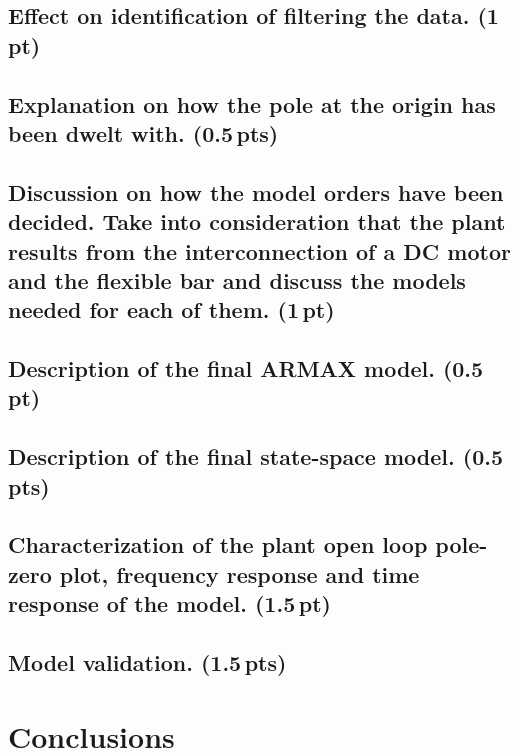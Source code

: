 \documentclass[a4paper,12pt]{article}
\begin{document}
\subsection{Effect on identification of filtering the data. (1\,pt)}
\vspace{10pt}


\subsection{Explanation on how the pole at the origin has been dwelt with. (0.5\,pts)}
\vspace{10pt}


\subsection{Discussion on how the model orders have been decided. Take into consideration that the plant results from the interconnection of a DC motor and the flexible bar and discuss the models needed for each of them. (1\,pt)}
\vspace{10pt}


\subsection{Description of the final ARMAX model. (0.5\,pt)}
\vspace{10pt}


\subsection{Description of the final state-space model. (0.5\,pts)}
\vspace{10pt}


\subsection{Characterization of the plant open loop pole-zero plot, frequency response and time response of the model. (1.5\,pt)}
\vspace{10pt}


\subsection{Model validation. (1.5\,pts)}
\vspace{10pt}


\section*{Conclusions}

\end{document}
